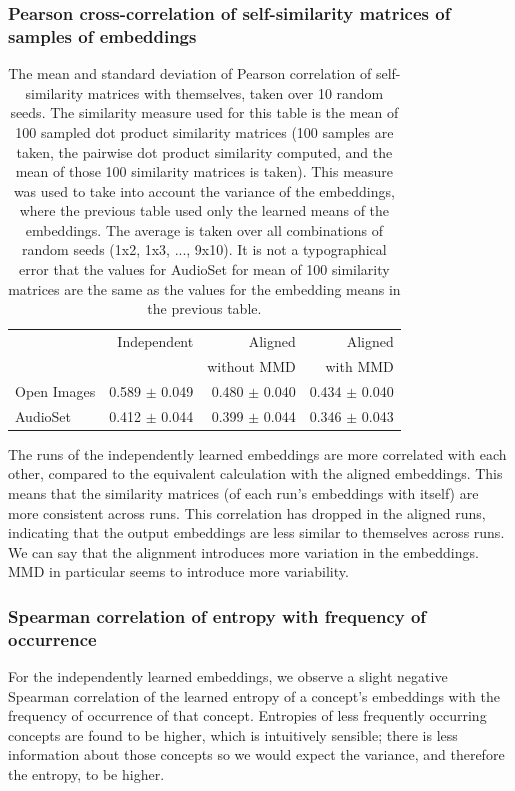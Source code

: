 \subsubsection{Pearson cross-correlation of self-similarity matrices of samples of embeddings}
\begin{table}[H]
\centering
\begin{tabular}{lrrr}
\toprule
       &   Independent & Aligned     &  Aligned  \\
       &               & without MMD &  with MMD \\
\midrule
Open Images    & 0.589 $\pm$ 0.049 & 0.480 $\pm$ 0.040 &     0.434 $\pm$  0.040 \\
AudioSet    & 0.412 $\pm$ 0.044 &  0.399 $\pm$ 0.044  &      0.346  $\pm$ 0.043  \\
\bottomrule
\end{tabular}
\caption{\label{table:corrsamples}The mean and standard deviation of Pearson correlation of self-similarity matrices with themselves, taken over 10 random seeds. The similarity measure used for this table is the mean of 100 sampled dot product similarity matrices (100 samples are taken, the pairwise dot product similarity computed, and the mean of those 100 similarity matrices is taken). This measure was used to take into account the variance of the embeddings, where the previous table used only the learned means of the embeddings. The average is taken over all combinations of random seeds (1x2, 1x3, ..., 9x10). It is not a typographical error that the values for AudioSet for mean of 100 similarity matrices are the same as the values for the embedding means in the previous table. }
\end{table}

The runs of the independently learned embeddings are more correlated with each other, compared to the equivalent calculation with the aligned embeddings. This means that the similarity matrices (of each run's embeddings with itself) are more consistent across runs. This correlation has dropped in the aligned runs, indicating that the output embeddings are less similar to themselves across runs. We can say that the alignment introduces more variation in the embeddings. MMD in particular seems to introduce more variability. 

\subsubsection{Spearman correlation of entropy with frequency of occurrence}
For the independently learned embeddings, we observe a slight negative Spearman correlation of the learned entropy of a concept's embeddings with the frequency of occurrence of that concept. Entropies of less frequently occurring concepts are found to be higher, which is intuitively sensible; there is less information about those concepts so we would expect the variance, and therefore the entropy, to be higher. 

